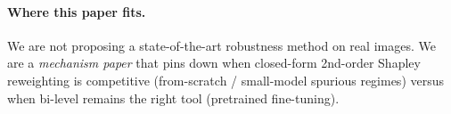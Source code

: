 \paragraph{Where this paper fits.}
We are not proposing a state-of-the-art robustness method on real
images. We are a \emph{mechanism paper} that pins down when closed-form
2nd-order Shapley reweighting is competitive (from-scratch / small-model
spurious regimes) versus when bi-level remains the right tool
(pretrained fine-tuning).
